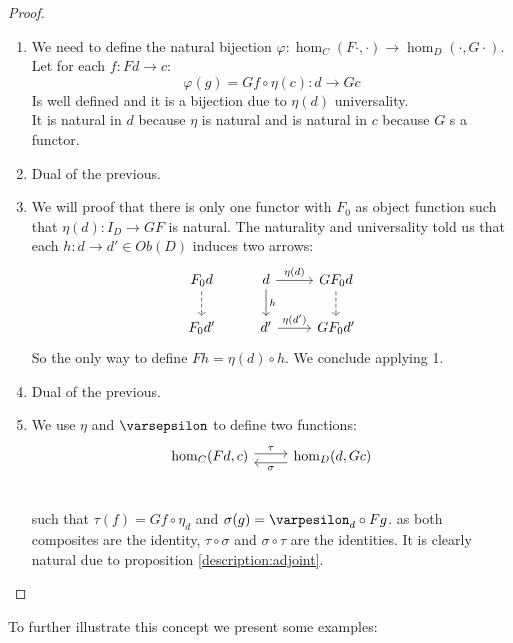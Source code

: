 \begin{proof}
  \begin{enumerate}
    
  \item We need to define the natural bijection $\varphi: \hom_C(F\cdot,\cdot)\to \hom_D(\cdot,G\cdot)$. Let  for each $f:Fd \to c$:
    $$\varphi(g) = Gf\circ \eta(c): d \to Gc$$ Is well defined and it is a bijection  due to $\eta(d)$ universality.\\

    It is natural in $d$ because $\eta$ is natural and is natural in $c$ because $G$ s a functor.
  \item Dual of the previous.
  \item We will proof that there is only one functor with $F_0$ as object function such that $\eta (d): I_D\to GF$ is natural. The naturality and universality told us that each $h:d\to d'\in Ob(D)$ induces two arrows:
\[
\begin{tikzcd}
  F_0 d\arrow[dashed]{d} & d\arrow{d}{h}\arrow{r}{\eta (d)}&GF_0d\arrow[dashed]{d}\\
  F_0 d'& d'\arrow{r}{\eta (d')} & GF_0d'
\end{tikzcd}
\]
    So the only way to define $Fh= \eta (d) \circ h$. We conclude applying 1.
  \item Dual of the previous.
  \item We use $\eta$ and $\varsepsilon$ to define two functions:
    \[
    \begin{tikzcd}
      \hom_C(Fd,c) \arrow[r, shift left=.5ex, "\tau"{name=F}] &
      \hom_D(d,Gc)\arrow[l, shift left=1ex, "\sigma"{name=G}] \\
    \end{tikzcd}
  \]

  such that $\tau(f) = Gf\circ \eta_d$ and $\sigma(g)=\varpesilon_d \circ Fg$. as both composites are the identity, $\tau \circ \sigma$ and $\sigma \circ \tau$ are the identities. It is clearly natural due to proposition \ref{description:adjoint}.
\end{enumerate}
\end{proof}
To further illustrate this concept we present some examples:
